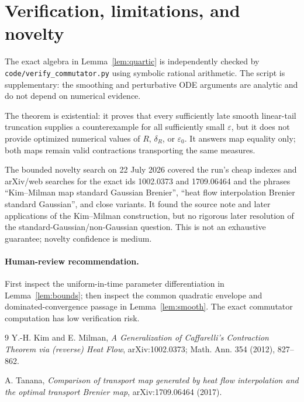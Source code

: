 \documentclass[11pt]{article}
\begin{document}
\section{Verification, limitations, and novelty}

The exact algebra in Lemma~\ref{lem:quartic} is independently checked by
\texttt{code/verify\_commutator.py} using symbolic rational arithmetic.  The
script is supplementary: the smoothing and perturbative ODE arguments are
analytic and do not depend on numerical evidence.

The theorem is existential: it proves that every sufficiently late smooth
linear-tail truncation supplies a counterexample for all sufficiently small
$\varepsilon$, but it does not provide optimized numerical values of $R$,
$\delta_R$, or $\varepsilon_0$.  It answers map equality only; both maps remain
valid contractions transporting the same measures.

The bounded novelty search on 22 July 2026 covered the run's cheap indexes and
arXiv/web searches for the exact ids 1002.0373 and 1709.06464 and the phrases
``Kim--Milman map standard Gaussian Brenier'', ``heat flow interpolation
Brenier standard Gaussian'', and close variants.  It found the source note
and later applications of the Kim--Milman construction, but no rigorous later
resolution of the standard-Gaussian/non-Gaussian question.  This is not an
exhaustive guarantee; novelty confidence is medium.

\paragraph{Human-review recommendation.}
First inspect the uniform-in-time parameter differentiation in
Lemma~\ref{lem:bounds}; then inspect the common quadratic envelope and
dominated-convergence passage in Lemma~\ref{lem:smooth}. The exact
commutator computation has low verification risk.

\begin{thebibliography}{9}
Y.-H. Kim and E. Milman,
\emph{A Generalization of Caffarelli's Contraction Theorem via (reverse) Heat
Flow}, arXiv:1002.0373; Math. Ann. 354 (2012), 827--862.

A. Tanana,
\emph{Comparison of transport map generated by heat flow interpolation and
the optimal transport Brenier map}, arXiv:1709.06464 (2017).
\end{thebibliography}
\end{document}
